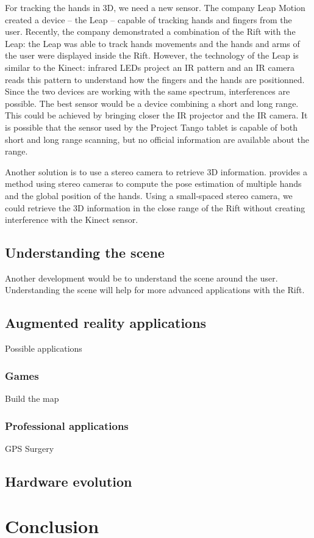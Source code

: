 \documentclass[12pt]{article}
\begin{document}
For tracking the hands in 3D, we need a new sensor. The company Leap Motion created a device -- the Leap -- capable of tracking hands and fingers from the user. Recently, the company demonstrated a combination of the Rift with the Leap: the Leap was able to track hands movements and the hands and arms of the user were displayed inside the Rift. However, the technology of the Leap is similar to the Kinect: infrared LEDs project an IR pattern and an IR camera reads this pattern to understand how the fingers and the hands are positionned. Since the two devices are working with the same spectrum, interferences are possible. The best sensor would be a device combining a short and long range. This could be achieved by bringing closer the IR projector and the IR camera. It is possible that the sensor used by the Project Tango tablet is capable of both short and long range scanning, but no official information are available about the range.

Another solution is to use a stereo camera to retrieve 3D information. \cite{HandStereo} provides a method using stereo cameras to compute the pose estimation of multiple hands and the global position of the hands. Using a small-spaced stereo camera, we could retrieve the 3D information in the close range of the Rift without creating interference with the Kinect sensor.

\subsection{Understanding the scene}
Another development would be to understand the scene around the user. Understanding the scene will help for more advanced applications with the Rift.

\subsection{Augmented reality applications}
Possible applications

\subsubsection{Games}
Build the map
\subsubsection{Professional applications}
GPS
Surgery

\subsection{Hardware evolution}


\newpage
\section*{Conclusion}

\newpage
{}


\end{document}
